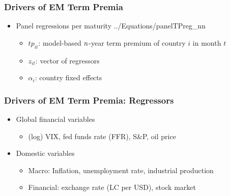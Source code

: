 \documentclass[12pt, aspectratio=169, xcolor=dvipsnames]{beamer} 			         %
\begin{document}
\begin{frame}
	\frametitle{Drivers of EM Term Premia}
	\begin{itemize}
		\item Panel regressions per maturity
		 {../Equations/panelTPreg_nn}
		\vspace{-0.5cm}
		\begin{itemize}
			\item $tp_{it}$: model-based $n$-year term premium of country $i$ in month $t$
			\item $z_{it}$: vector of regressors
			\item $\alpha_{i}$: country fixed effects
		\end{itemize}
	\end{itemize}
\end{frame}

\begin{frame}
\frametitle{Drivers of EM Term Premia: Regressors}
\begin{itemize}
	\item Global financial variables
	\begin{itemize}
		\item (log) VIX, fed funds rate (FFR), S\&P, oil price
	\end{itemize}
	\item Domestic variables
	\begin{itemize}
		\item Macro: Inflation, unemployment rate, industrial production
		\item Financial: exchange rate (LC per USD), stock market
	\end{itemize}
\end{itemize}
\end{frame}
\end{document}
